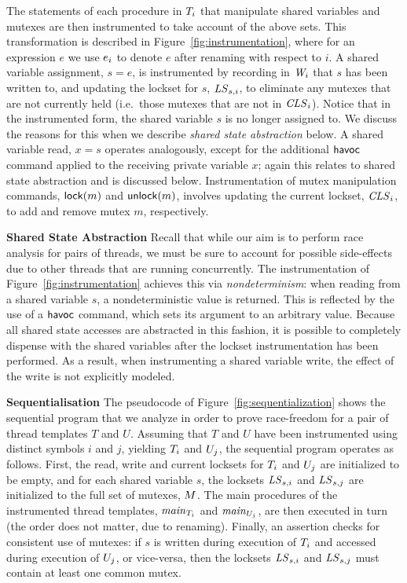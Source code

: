 The statements of each procedure in $T_{i}$ that manipulate shared variables and mutexes are then instrumented to take account of the above sets.  This transformation is described in Figure~\ref{fig:instrumentation}, where for an expression $e$ we use $e_{i}$ to denote $e$ after renaming with respect to $i$.  A shared variable assignment, $s = e$, is instrumented by recording in $\mathit{W}_{i}$ that $s$ has been written to, and updating the lockset for $s$, $\mathit{LS}_{s,i}$, to eliminate any mutexes that are not currently held (i.e.\ those mutexes that are not in $\mathit{CLS}_{i}$).  Notice that in the instrumented form, the shared variable $s$ is no longer assigned to.  We discuss the reasons for this when we describe \emph{shared state abstraction} below.  A shared variable read, $x = s$ operates analogously, except for the additional $\mathsf{havoc}$ command applied to the receiving private variable $x$; again this relates to shared state abstraction and is discussed below.  Instrumentation of mutex manipulation commands, $\mathsf{lock}(m)$ and $\mathsf{unlock}(m)$, involves updating the current lockset, $\mathit{CLS}_{i}$, to add and remove mutex $m$, respectively.

\medskip\noindent\textbf{Shared State Abstraction }
%
Recall that while our aim is to perform race analysis for pairs of threads, we must be sure to account for possible side-effects due to other threads that are running concurrently.  The instrumentation of Figure~\ref{fig:instrumentation} achieves this via \emph{nondeterminism}: when reading from a shared variable $s$, a nondeterministic value is returned.  This is reflected by the use of a $\mathsf{havoc}$ command, which sets its argument to an arbitrary value.  Because all shared state accesses are abstracted in this fashion, it is possible to completely dispense with the shared variables after the lockset instrumentation has been performed.  As a result, when instrumenting a shared variable write, the effect of the write is not explicitly modeled.

\medskip\noindent\textbf{Sequentialisation }
%
The pseudocode of Figure~\ref{fig:sequentialization} shows the sequential program that we analyze in order to prove race-freedom for a pair of thread templates $T$ and $U$. Assuming that $T$ and $U$ have been instrumented using distinct symbols $i$ and $j$, yielding $T_{i}$ and $U_{j}$, the sequential program operates as follows. First, the read, write and current locksets for $T_{i}$ and $U_{j}$ are initialized to be empty, and for each shared variable $s$, the locksets $\mathit{LS}_{s,i}$ and $\mathit{LS}_{s,j}$ are initialized to the full set of mutexes, $M$.  The main procedures of the instrumented thread templates, $\mathit{main}_{T_{i}}$ and $\mathit{main}_{U_{j}}$, are then executed in turn (the order does not matter, due to renaming). Finally, an assertion checks for consistent use of mutexes: if $s$ is written during execution of $T_{i}$ and accessed during execution of $U_{j}$, or vice-versa, then the locksets $\mathit{LS}_{s,i}$ and $\mathit{LS}_{s,j}$ must contain at least one common mutex.

